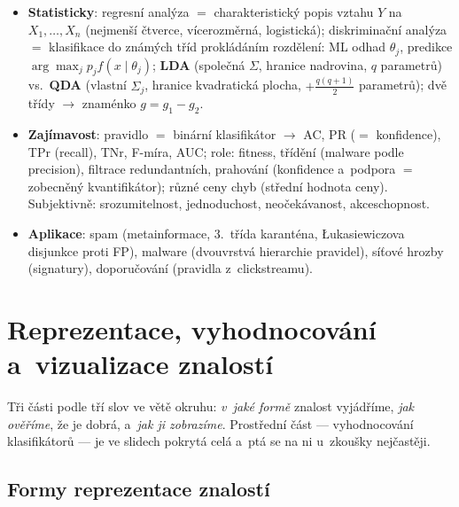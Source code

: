 \documentclass[11pt,a4paper]{article}
\theoremstyle{definition}
\begin{document}
\begin{itemize}
      pravděpodobností --- asociační pravidla, $\frac{a}{a+b}\ge c_0$ (konfidence)
      $\wedge$ $\frac{a}{n}\ge s_0$ (podpora); (2)~testy hypotéz --- jednostranný
      Fisherův test zamítá nezávislost ve prospěch pozitivní závislosti.
\item \textbf{Statisticky}: regresní analýza $=$ charakteristický popis vztahu $Y$ na
      $X_1,\dots,X_n$ (nejmenší čtverce, vícerozměrná, logistická); diskriminační
      analýza $=$ klasifikace do známých tříd prokládáním rozdělení: ML odhad
      $\theta_j$, predikce $\arg\max_j p_j f(x\mid\theta_j)$; \textbf{LDA} (společná
      $\Sigma$, hranice nadrovina, $q$ parametrů) vs.\ \textbf{QDA} (vlastní $\Sigma_j$,
      hranice kvadratická plocha, $+\frac{q(q+1)}{2}$ parametrů); dvě třídy $\to$
      znaménko $g=g_1-g_2$.
\item \textbf{Zajímavost}: pravidlo $=$ binární klasifikátor $\to$ AC, PR
      ($=$ konfidence), TPr (recall), TNr, F-míra, AUC; role: fitness, třídění
      (malware podle precision), filtrace redundantních, prahování (konfidence
      a~podpora $=$ zobecněný kvantifikátor); různé ceny chyb (střední hodnota ceny).
      Subjektivně: srozumitelnost, jednoduchost, neočekávanost, akceschopnost.
\item \textbf{Aplikace}: spam (metainformace, 3.~třída karanténa, Łukasiewiczova
      disjunkce proti FP), malware (dvouvrstvá hierarchie pravidel), síťové hrozby
      (signatury), doporučování (pravidla z~clickstreamu).
\end{itemize}
\newpage
\section{Reprezentace, vyhodnocování a~vizualizace znalostí}
\label{sec:reprez}

Tři části podle tří slov ve větě okruhu: \emph{v~jaké formě} znalost vyjádříme, \emph{jak
ověříme}, že je dobrá, a~\emph{jak ji zobrazíme}. Prostřední část --- vyhodnocování
klasifikátorů --- je ve slidech pokrytá celá a~ptá se na ni u~zkoušky nejčastěji.

\subsection{Formy reprezentace znalostí}
\end{document}
